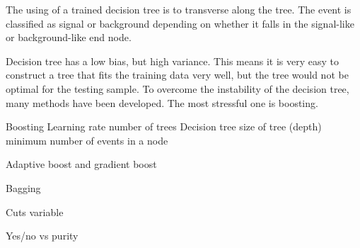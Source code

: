The using of a trained decision tree is to transverse along the tree. The event is classified as signal or background depending on whether it falls in the signal-like or background-like end node.

Decision tree has a low bias, but high variance. This means it is very easy to construct a tree that fits the training data very well, but the tree would not be optimal for the testing sample. To overcome the instability of the decision tree, many methods have been developed. The most stressful one is boosting.





Boosting
Learning rate
number of trees
Decision tree
size of tree (depth)
minimum number of events in a node


Adaptive boost and gradient boost

Bagging

Cuts variable

Yes/no vs purity


